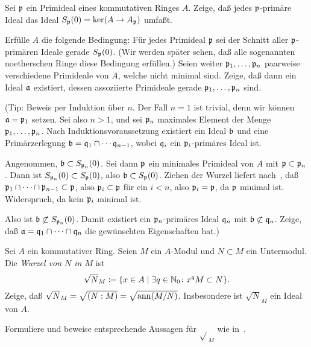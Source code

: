 \begin{exercise}
	Sei \(\mathfrak{p}\) ein Primideal eines kommutativen Ringes \(A\). Zeige, daß
	jedes \(\mathfrak{p}\)-primäre Ideal das Ideal \(S_{\mathfrak{p}}(0) = \ker
	(A \to A_{\mathfrak{p}})\) umfaßt.
	
	Erfülle \(A\) die folgende Bedingung: Für jedes Primideal \(\mathfrak{p}\) sei der Schnitt
	aller \(\mathfrak{p}\)-primären Ideale gerade \(S_{\mathfrak{p}}(0)\). (Wir
	werden später sehen, daß alle sogenannten noetherschen Ringe diese Bedingung
	erfüllen.) %
	Seien weiter \(\mathfrak{p}_1, \dotsc, \mathfrak{p}_n\) paarweise verschiedene
	Primideale von \(A\), welche nicht minimal sind. Zeige, daß dann ein Ideal
	\(\mathfrak{a}\) existiert, dessen assoziierte Primideale gerade \(\mathfrak{p}_1,
	\dotsc, \mathfrak{p}_n\) sind.
	
	(Tip: Beweis per Induktion über \(n\). Der Fall \(n = 1\) ist trivial, denn
	wir können \(\mathfrak{a} = \mathfrak{p}_1\) setzen. Sei also \(n > 1\), und sei
	\(\mathfrak{p}_n\) maximales Element der Menge \(\mathfrak{p}_1, \dotsc,
	\mathfrak{p}_n\). Nach Induktionsvoraussetzung existiert ein Ideal \(\mathfrak{b}\)
	und eine Primärzerlegung \(\mathfrak{b} = \mathfrak{q}_1 \cap \dotsb
	\mathfrak{q}_{n - 1}\), wobei \(\mathfrak{q}_i\) ein \(\mathfrak{p}_i\)-primäres Ideal
	ist.
	
	Angenommen, \(\mathfrak{b} \subset S_{\mathfrak{p}_n}(0)\). Sei dann \(\mathfrak{p}\)
	ein minimales Primideal von \(A\) mit \(\mathfrak{p} \subset \mathfrak{p}_n\).
	Dann ist \(S_{\mathfrak{p}_n}(0) \subset S_{\mathfrak{p}}(0)\), also
	\(\mathfrak{b} \subset S_{\mathfrak{p}}(0)\). Ziehen der Wurzel liefert
	nach~, daß \(\mathfrak{p}_1 \cap \dotsb \cap \mathfrak{p}_{n - 1} \subset \mathfrak{p}\), also \(\mathfrak{p}_i \subset \mathfrak{p}\) für ein
	\(i < n\), also \(\mathfrak{p}_i = \mathfrak{p}\), da \(\mathfrak{p}\) minimal ist.
	Widerspruch, da kein \(\mathfrak{p}_i\) minimal ist.
	
	Also ist \(\mathfrak{b} \not\subset S_{\mathfrak{p}_n}(0)\). Damit existiert ein
	\(\mathfrak{p}_n\)-primäres Ideal \(\mathfrak{q}_n\) mit \(\mathfrak{b}
	\not\subset \mathfrak{q}_n\). Zeige, daß \(\mathfrak{a} = \mathfrak{q}_1 \cap \dotsb
	\cap \mathfrak{q}_n\) die gewünschten Eigenschaften hat.)
\end{exercise}

\begin{exercise}
	Sei \(A\) ein kommutativer Ring. Seien \(M\) ein \(A\)-Modul und
	\(N \subset M\) ein Untermodul. Die \emph{Wurzel von \(N\) in \(M\)} ist
	\[
		\sqrt{N}_M \coloneqq \{x \in A \mid \exists q \in \mathbb N_0\colon
		x^q M \subset N\}.
	\]
	Zeige, daß \(\sqrt{N}_M = \sqrt{(N : M)} = \sqrt{\operatorname{ann}(M/N)}\). Insbesondere
	ist \(\sqrt{N}_M\) ein Ideal von \(A\).
	
	Formuliere und beweise entsprechende Aussagen für \(\sqrt{}_M\) wie
	in~.
\end{exercise}

